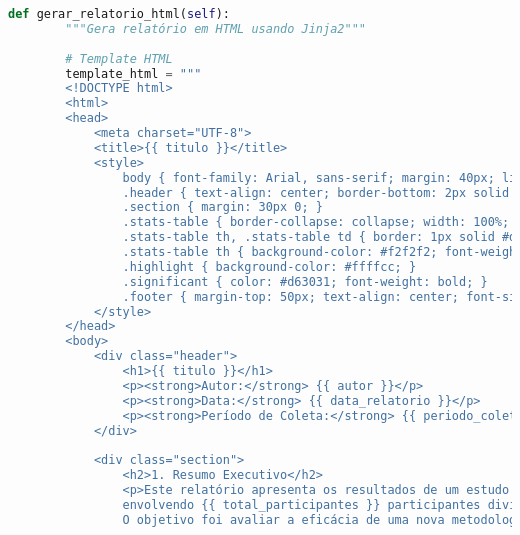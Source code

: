 \begin{pythonbox}
\begin{lstlisting}[language=Python]
    def gerar_relatorio_html(self):
        """Gera relatório em HTML usando Jinja2"""
        
        # Template HTML
        template_html = """
        <!DOCTYPE html>
        <html>
        <head>
            <meta charset="UTF-8">
            <title>{{ titulo }}</title>
            <style>
                body { font-family: Arial, sans-serif; margin: 40px; line-height: 1.6; }
                .header { text-align: center; border-bottom: 2px solid #333; padding-bottom: 20px; }
                .section { margin: 30px 0; }
                .stats-table { border-collapse: collapse; width: 100%; margin: 20px 0; }
                .stats-table th, .stats-table td { border: 1px solid #ddd; padding: 12px; text-align: left; }
                .stats-table th { background-color: #f2f2f2; font-weight: bold; }
                .highlight { background-color: #ffffcc; }
                .significant { color: #d63031; font-weight: bold; }
                .footer { margin-top: 50px; text-align: center; font-size: 0.9em; color: #666; }
            </style>
        </head>
        <body>
            <div class="header">
                <h1>{{ titulo }}</h1>
                <p><strong>Autor:</strong> {{ autor }}</p>
                <p><strong>Data:</strong> {{ data_relatorio }}</p>
                <p><strong>Período de Coleta:</strong> {{ periodo_coleta }}</p>
            </div>
            
            <div class="section">
                <h2>1. Resumo Executivo</h2>
                <p>Este relatório apresenta os resultados de um estudo experimental sobre aprendizado, 
                envolvendo {{ total_participantes }} participantes divididos entre grupo controle e experimental. 
                O objetivo foi avaliar a eficácia de uma nova metodologia de ensino.</p>
   \end{lstlisting}
\end{pythonbox}

